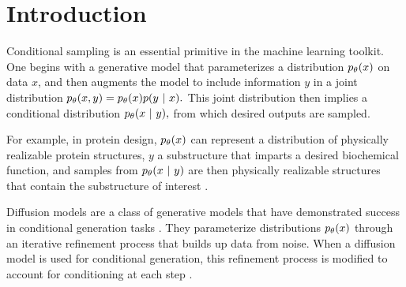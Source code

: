 \section{Introduction}\label{sec:intro} 

Conditional sampling is an essential primitive in the machine learning toolkit.
One begins with a generative model that parameterizes a distribution $p_{\theta}(x)$ on data $x$, and then augments the model to include information $y$ in a joint distribution $p_{\theta}(x, y)=p_{\theta}(x)p(y~\vert~ x).$
This joint distribution then implies a conditional distribution $p_{\theta} (x~\vert~ y),$ from which desired outputs are sampled.

For example, in protein design, $p_{\theta}(x)$ can represent a distribution of physically realizable protein structures, 
$y$ a substructure that imparts a desired biochemical function, 
and samples from $p_{\theta}(x ~\vert~ y)$ are then physically realizable structures that contain the substructure of interest \citep[e.g.][]{trippe2022diffusion,watson2022broadly}.

Diffusion models are a class of generative models that have demonstrated success in conditional generation tasks \citep{ho2020denoising,ramesh2022hierarchical,song2020score,watson2022broadly}.
They parameterize distributions $p_{\theta} (x)$ through an iterative refinement process that builds up data from noise.
When a diffusion model is used for conditional generation, this refinement process is modified to account for conditioning at each step \citep{dhariwal2021diffusion,hovideo,ramesh2022hierarchical,song2020score}.

